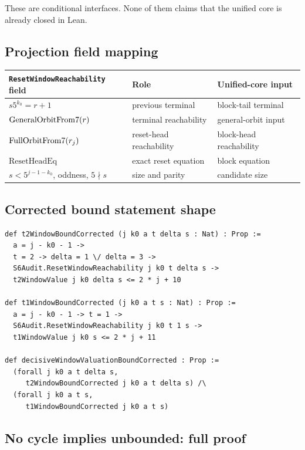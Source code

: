 These are conditional interfaces.  None of them claims that the
unified core is already closed in Lean.

\subsection{Projection field mapping}

\begin{center}
\small
\begin{tabular}{@{}p{}p{}p{}@{}}
\toprule
\texttt{ResetWindowReachability} field & Role & Unified-core input \\
\midrule
$s5^{k_0}=r+1$ & previous terminal & block-tail terminal \\
$\mathrm{GeneralOrbitFrom7}(r)$ & terminal reachability & general-orbit input \\
$\mathrm{FullOrbitFrom7}(r_j)$ & reset-head reachability & block-head reachability \\
$\mathrm{ResetHeadEq}$ & exact reset equation & block equation \\
$s<5^{j-1-k_0}$, oddness, $5\nmid s$ & size and parity & candidate size \\
\bottomrule
\end{tabular}
\end{center}

\subsection{Corrected bound statement shape}

\begin{verbatim}
def t2WindowBoundCorrected (j k0 a t delta s : Nat) : Prop :=
  a = j - k0 - 1 ->
  t = 2 -> delta = 1 \/ delta = 3 ->
  S6Audit.ResetWindowReachability j k0 t delta s ->
  t2WindowValue j k0 delta s <= 2 * j + 10

def t1WindowBoundCorrected (j k0 a t s : Nat) : Prop :=
  a = j - k0 - 1 -> t = 1 ->
  S6Audit.ResetWindowReachability j k0 t 1 s ->
  t1WindowValue j k0 s <= 2 * j + 11

def decisiveWindowValuationBoundCorrected : Prop :=
  (forall j k0 a t delta s,
     t2WindowBoundCorrected j k0 a t delta s) /\
  (forall j k0 a t s,
     t1WindowBoundCorrected j k0 a t s)
\end{verbatim}

\subsection{No cycle implies unbounded: full proof}

